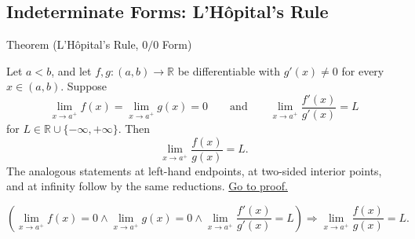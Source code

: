 \subsection{Indeterminate Forms: L'H\^{o}pital's Rule}
\label{sec:lhopital}

\begin{theorembox}{Theorem (L'H\^{o}pital's Rule, \(0/0\) Form)}
\begin{theorem}
\label{thm:lhopital-zero-over-zero}
Let \(a<b\), and let \(f,g:(a,b)\to\mathbb{R}\) be differentiable with \(g'(x)\neq 0\) for every \(x\in(a,b)\). Suppose
\[
  \lim_{x\to a^+}f(x)=\lim_{x\to a^+}g(x)=0
  \qquad\text{and}\qquad
  \lim_{x\to a^+}\frac{f'(x)}{g'(x)}=L
\]
for \(L\in\mathbb{R}\cup\{-\infty,+\infty\}\). Then
\[
  \lim_{x\to a^+}\frac{f(x)}{g(x)}=L.
\]
The analogous statements at left-hand endpoints, at two-sided interior points, and at infinity follow by the same reductions.
\hyperref[prf:lhopital-zero-over-zero]{Go to proof.}
\end{theorem}
\end{theorembox}

\begin{remark*}
\[
  \left(
  \lim_{x\to a^+}f(x)=0
  \land
  \lim_{x\to a^+}g(x)=0
  \land
  \lim_{x\to a^+}\frac{f'(x)}{g'(x)}=L
  \right)
  \Longrightarrow
  \lim_{x\to a^+}\frac{f(x)}{g(x)}=L.
\]
\end{remark*}


